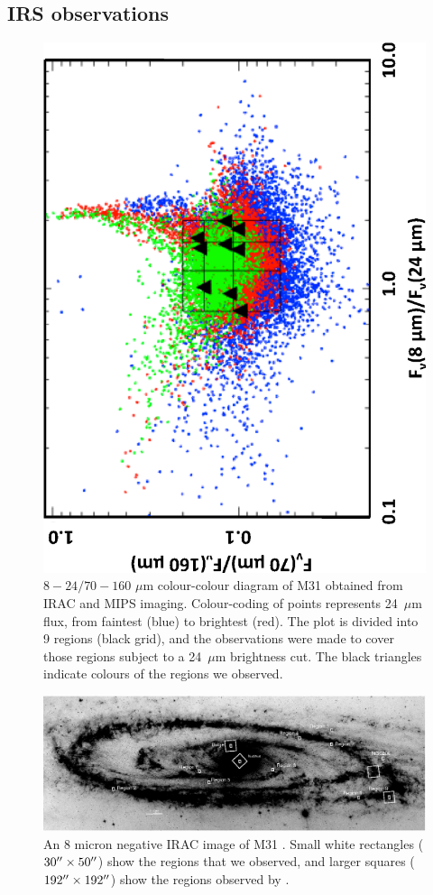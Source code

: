 \subsection{IRS observations}
\label{sect:irs_obs}

\begin{figure}
\centering
\includegraphics[width = 5.5 cm,angle=270]{fig1.eps}
\caption{$8 - 24/70 - 160$ $\mu$m colour-colour diagram of M31 obtained from IRAC and MIPS imaging. Colour-coding of points represents
24~$\mu$m flux, from faintest (blue) to brightest (red). The plot is divided into 9 regions (black grid), and the observations were made to 
cover those regions subject to a 24~$\mu$m brightness cut. The black triangles indicate colours of the regions we observed.}
\label{colourmaps}
\end{figure}


\begin{figure}
\centering
\includegraphics[scale=0.9]{./fig2.eps}
\caption{An 8 micron negative IRAC image of M31 \citep[dark colours indicate higher flux,][]{Barmby2006lr}. Small white rectangles ($30\hbox{$^{\prime\prime}$}\times50\hbox{$^{\prime\prime}$}$) show the regions that we observed, and larger squares ($192\hbox{$^{\prime\prime}$}\times192\hbox{$^{\prime\prime}$}$) show the regions observed by  \citet{1998Cesarsky}.
\label{m31}
}
\end{figure}

